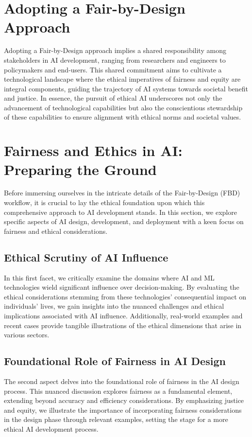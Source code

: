 \section{Adopting a Fair-by-Design Approach}

Adopting a Fair-by-Design approach implies a shared responsibility among stakeholders in AI development, ranging from researchers and engineers to policymakers and end-users. This shared commitment aims to cultivate a technological landscape where the ethical imperatives of fairness and equity are integral components, guiding the trajectory of AI systems towards societal benefit and justice. In essence, the pursuit of ethical AI underscores not only the advancement of technological capabilities but also the conscientious stewardship of these capabilities to ensure alignment with ethical norms and societal values.

\section{Fairness and Ethics in AI: Preparing the Ground}

Before immersing ourselves in the intricate details of the Fair-by-Design (FBD) workflow, it is crucial to lay the ethical foundation upon which this comprehensive approach to AI development stands. In this section, we explore specific aspects of AI design, development, and deployment with a keen focus on fairness and ethical considerations.

\subsection{Ethical Scrutiny of AI Influence}

In this first facet, we critically examine the domains where AI and ML technologies wield significant influence over decision-making. By evaluating the ethical considerations stemming from these technologies' consequential impact on individuals' lives, we gain insights into the nuanced challenges and ethical implications associated with AI influence. Additionally, real-world examples and recent cases provide tangible illustrations of the ethical dimensions that arise in various sectors.

\subsection{Foundational Role of Fairness in AI Design}

The second aspect delves into the foundational role of fairness in the AI design process. This nuanced discussion explores fairness as a fundamental element, extending beyond accuracy and efficiency considerations. By emphasizing justice and equity, we illustrate the importance of incorporating fairness considerations in the design phase through relevant examples, setting the stage for a more ethical AI development process.

